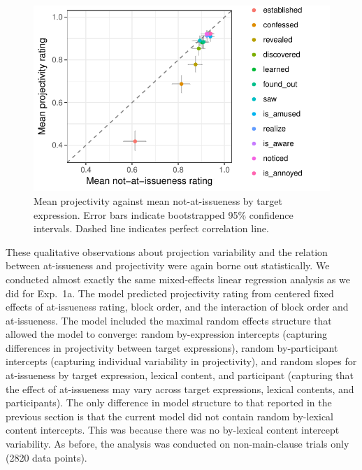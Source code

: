 \documentclass[11pt,fleqn]{article}
\newcommand{\6}{\mbox{$[\hspace*{-.6mm}[$}}
\newcommand{\9}{\mbox{$]\hspace*{-.6mm}]$}}
\begin{document}
\begin{figure}[!h]

\begin{center}
\includegraphics[width=12cm]{../results/exp1b/graphs/ai-proj-bytrigger}
\end{center}

\caption{Mean projectivity against mean not-at-issueness by target expression. Error bars indicate bootstrapped 95\% confidence intervals. Dashed line indicates perfect correlation line.}
\label{fig:f-proj-ai-1b}
\end{figure}

These qualitative observations about projection variability and the relation between at-issueness and projectivity were again borne out statistically. We conducted almost exactly the same mixed-effects linear regression analysis as we did for Exp.~1a. The model predicted projectivity rating from centered fixed effects of at-issueness rating, block order, and the interaction of block order and at-issueness. The model included the maximal random effects structure that allowed the model to converge: random by-expression intercepts (capturing differences in projectivity between target expressions),  random by-participant intercepts (capturing individual variability in projectivity), and random slopes for at-issueness by target expression, lexical content, and participant (capturing that the effect of at-issueness may vary across target expressions, lexical contents, and participants). The only difference in model structure to that reported in the previous section is that the current model did not contain random by-lexical content intercepts. This was because there was no by-lexical content intercept variability. As before, the analysis was conducted on non-main-clause trials only (2820 data points).
\end{document}
